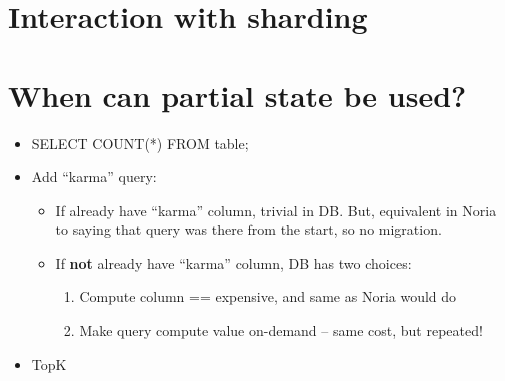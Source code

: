 \section{Interaction with sharding}

\section{When can partial state be used?}

\begin{itemize}
 \item SELECT COUNT(*) FROM table;
 \item Add ``karma'' query:
   \begin{itemize}
    \item If already have ``karma'' column, trivial in DB. But, equivalent in
      Noria to saying that query was there from the start, so no migration.
    \item If \textbf{not} already have ``karma'' column, DB has two choices:
     \begin{enumerate}
      \item Compute column == expensive, and same as Noria would do
      \item Make query compute value on-demand -- same cost, but repeated!
     \end{enumerate}
   \end{itemize}
 \item TopK
\end{itemize}

